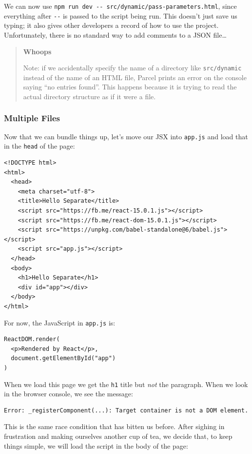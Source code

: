 We can now use
\texttt{npm\ run\ dev\ -\/-\ src/dynamic/pass-parameters.html}, since
everything after \texttt{-\/-} is passed to the script being run. This
doesn't just save us typing; it also gives other developers a record of
how to use the project. Unfortunately, there is no standard way to add
comments to a JSON file\ldots{}

\begin{quote}
\textbf{Whoops}

Note: if we accidentally specify the name of a directory like
\texttt{src/dynamic} instead of the name of an HTML file, Parcel prints
an error on the console saying ``no entries found''. This happens
because it is trying to read the actual directory structure as if it
were a file.
\end{quote}

\subsubsection{Multiple Files}\label{s:dynamic-multiple}

Now that we can bundle things up, let's move our JSX into
\texttt{app.js} and load that in the \texttt{head} of the page:

\begin{verbatim}
<!DOCTYPE html>
<html>
  <head>
    <meta charset="utf-8">
    <title>Hello Separate</title>
    <script src="https://fb.me/react-15.0.1.js"></script>
    <script src="https://fb.me/react-dom-15.0.1.js"></script>
    <script src="https://unpkg.com/babel-standalone@6/babel.js"></script>
    <script src="app.js"></script>
  </head>
  <body>
    <h1>Hello Separate</h1>
    <div id="app"></div>
  </body>
</html>
\end{verbatim}

For now, the JavaScript in \texttt{app.js} is:

\begin{verbatim}
ReactDOM.render(
  <p>Rendered by React</p>,
  document.getElementById("app")
)
\end{verbatim}

When we load this page we get the \texttt{h1} title but \emph{not} the
paragraph. When we look in the browser console, we see the message:

\begin{verbatim}
Error: _registerComponent(...): Target container is not a DOM element.
\end{verbatim}

This is the same race condition that has bitten us before. After sighing
in frustration and making ourselves another cup of tea, we decide that,
to keep things simple, we will load the script in the body of the page:

